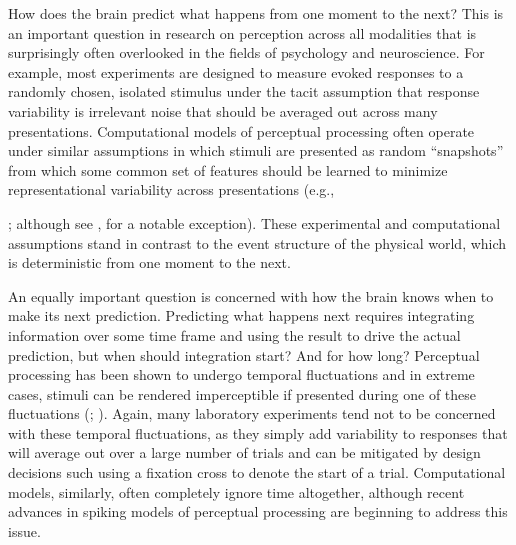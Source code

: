 \documentclass[dwyatte_dissertation.tex]{subfiles}
\begin{document}
How does the brain predict what happens from one moment to the next? This is an important question in research on perception across all modalities that is surprisingly often overlooked in the fields of psychology and neuroscience. For example, most experiments are designed to measure evoked responses to a randomly chosen, isolated stimulus under the tacit assumption that response variability is irrelevant noise that should be averaged out across many presentations. Computational models of perceptual processing often operate under similar assumptions in which stimuli are presented as random ``snapshots'' from which some common set of features should be learned to minimize representational variability across presentations (e.g., {; although see , for a notable exception). These experimental and computational assumptions stand in contrast to the event structure of the physical world, which is deterministic from one moment to the next. 

An equally important question is concerned with how the brain knows when to make its next prediction. Predicting what happens next requires integrating information over some time frame and using the result to drive the actual prediction, but when should integration start? And for how long? Perceptual processing has been shown to undergo temporal fluctuations and in extreme cases, stimuli can be rendered imperceptible if presented during one of these fluctuations (; ). Again, many laboratory experiments tend not to be concerned with these temporal fluctuations, as they simply add variability to responses that will average out over a large number of trials and can be mitigated by design decisions such using a fixation cross to denote the start of a trial. Computational models, similarly, often completely ignore time altogether, although recent advances in spiking models of perceptual processing \cite[e.g.,]{MasquelierThorpe07} are beginning to address this issue.

}
\end{document}
